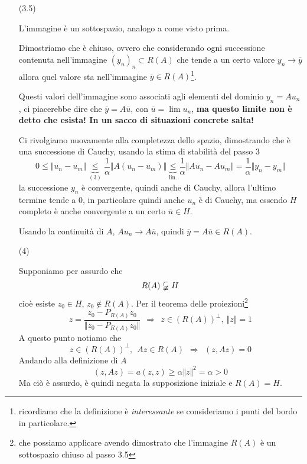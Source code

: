 \documentclass[10pt,a4paper,twoside,openright]{book}
\begin{document}
\begin{dimostrazione}
\begin{itemize}
\item[(3.5)]

L'immagine è un sottospazio, analogo a come visto prima.

Dimostriamo che è chiuso, ovvero che considerando ogni successione contenuta nell'immagine $(y_{n})_{n} \subset R(A)$ che tende a un certo valore $y_{n}\rightarrow \overline{y}$ allora quel valore sta nell'immagine $\overline{y} \in R(A)$\footnote{ricordiamo che la definizione è \textit{interessante} se consideriamo i punti del bordo in particolare.}.

Questi valori dell'immagine sono associati agli elementi del dominio $y_{n} =Au_{n}$, ci piacerebbe dire che $\overline{y} =A\overline{u}$, con $\overline{u} =\lim u_{n}$, \textbf{ma questo limite non è detto che esista! In un sacco di situazioni concrete salta!}

Ci rivolgiamo nuovamente alla completezza dello spazio, dimostrando che è una successione di Cauchy, usando la stima di stabilità del passo 3
\begin{equation*}
0\leqslant \Vert u_{n} -u_{m}\Vert \underbrace{\leqslant }_{(3)}\frac{1}{\alpha }\Vert A(u_{n} -u_{m})\Vert \underbrace{\leqslant }_{\text{lin.}}\frac{1}{\alpha }\Vert Au_{n} -Au_{m}\Vert =\frac{1}{\alpha }\Vert y_{n} -y_{m}\Vert 
\end{equation*}
la successione $y_{n}$ è convergente, quindi anche di Cauchy, allora l'ultimo termine tende a $0$, in particolare quindi anche $u_{n}$ è di Cauchy, ma essendo $H$ completo è anche convergente a un certo $\overline{u} \in H$.

Usando la continuità di $A$, $Au_{n}\rightarrow A\overline{u}$, quindi $\overline{y} =A\overline{u} \in R(A)$.



\item[(4)]

Supponiamo per assurdo che
\begin{equation*}
R(A) \varsubsetneqq H
\end{equation*}
cioè esiste $z_{0} \in H$, $z_{0} \notin R(A)$. Per il teorema delle proiezioni\footnote{che possiamo applicare avendo dimostrato che l'immagine $R(A)$ è un sottospazio chiuso al passo 3.5}
\begin{equation*}
z=\frac{z_{0} -P_{R(A)} z_{0}}{\Vert z_{0} -P_{R(A)} z_{0}\Vert } \ \ \Rightarrow \ \ z\in (R(A))^{\perp },\ \Vert z\Vert =1
\end{equation*}
A questo punto notiamo che
\begin{equation*}
z\in (R(A))^{\perp },\ \ Az\in R(A) \ \ \Rightarrow \ \ (z,Az) =0
\end{equation*}
Andando alla definizione di $A$
\begin{equation*}
(z,Az) =a(z,z) \geqslant \alpha \Vert z\Vert ^{2} =\alpha  >0
\end{equation*}
Ma ciò è assurdo, è quindi negata la supposizione iniziale e $R(A) =H$.
\end{itemize}
\end{dimostrazione}
\end{document}
